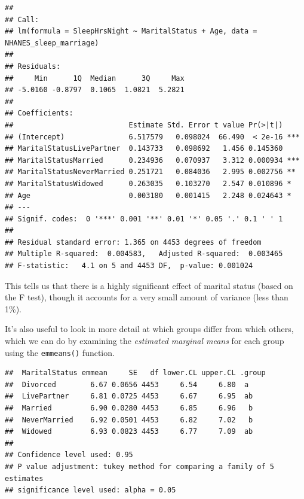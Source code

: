 \documentclass[12pt,]{book}
\newenvironment{Shaded}{\begin{snugshade}}{\end{snugshade}}
\newcommand{\CommentTok}[1]{\textcolor[rgb]{0.56,0.35,0.01}{\textit{#1}}}
\newcommand{\DataTypeTok}[1]{\textcolor[rgb]{0.13,0.29,0.53}{#1}}
\newcommand{\DecValTok}[1]{\textcolor[rgb]{0.00,0.00,0.81}{#1}}
\newcommand{\KeywordTok}[1]{\textcolor[rgb]{0.13,0.29,0.53}{\textbf{#1}}}
\newcommand{\NormalTok}[1]{#1}
\newcommand{\OperatorTok}[1]{\textcolor[rgb]{0.81,0.36,0.00}{\textbf{#1}}}
\newcommand{\StringTok}[1]{\textcolor[rgb]{0.31,0.60,0.02}{#1}}
\begin{document}
\begin{verbatim}
## 
## Call:
## lm(formula = SleepHrsNight ~ MaritalStatus + Age, data = NHANES_sleep_marriage)
## 
## Residuals:
##     Min      1Q  Median      3Q     Max 
## -5.0160 -0.8797  0.1065  1.0821  5.2821 
## 
## Coefficients:
##                           Estimate Std. Error t value Pr(>|t|)    
## (Intercept)               6.517579   0.098024  66.490  < 2e-16 ***
## MaritalStatusLivePartner  0.143733   0.098692   1.456 0.145360    
## MaritalStatusMarried      0.234936   0.070937   3.312 0.000934 ***
## MaritalStatusNeverMarried 0.251721   0.084036   2.995 0.002756 ** 
## MaritalStatusWidowed      0.263035   0.103270   2.547 0.010896 *  
## Age                       0.003180   0.001415   2.248 0.024643 *  
## ---
## Signif. codes:  0 '***' 0.001 '**' 0.01 '*' 0.05 '.' 0.1 ' ' 1
## 
## Residual standard error: 1.365 on 4453 degrees of freedom
## Multiple R-squared:  0.004583,   Adjusted R-squared:  0.003465 
## F-statistic:   4.1 on 5 and 4453 DF,  p-value: 0.001024
\end{verbatim}

This tells us that there is a highly significant effect of marital status (based on the F test), though it accounts for a very small amount of variance (less than 1\%).

It's also useful to look in more detail at which groups differ from which others, which we can do by examining the \emph{estimated marginal means} for each group using the \texttt{emmeans()} function.

\begin{Shaded}
\end{Shaded}

\begin{verbatim}
##  MaritalStatus emmean     SE   df lower.CL upper.CL .group
##  Divorced        6.67 0.0656 4453     6.54     6.80  a    
##  LivePartner     6.81 0.0725 4453     6.67     6.95  ab   
##  Married         6.90 0.0280 4453     6.85     6.96   b   
##  NeverMarried    6.92 0.0501 4453     6.82     7.02   b   
##  Widowed         6.93 0.0823 4453     6.77     7.09  ab   
## 
## Confidence level used: 0.95 
## P value adjustment: tukey method for comparing a family of 5 estimates 
## significance level used: alpha = 0.05
\end{verbatim}
\end{document}

